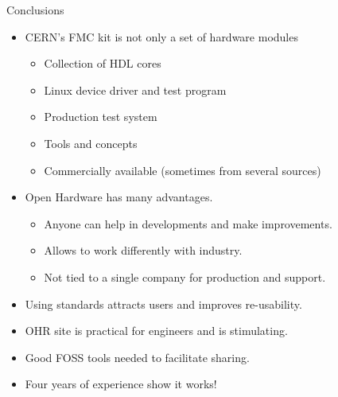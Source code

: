 \documentclass[compress,red]{beamer}
\begin{document}
\begin{frame}{Conclusions}

  \begin{block}{}
    \begin{itemize}
    \item CERN's FMC kit is not only a set of hardware modules
      \begin{itemize}
      \item Collection of HDL cores
      \item Linux device driver and test program
      \item Production test system
      \item Tools and concepts %
      \item Commercially available (sometimes from several sources)
      \end{itemize}
    \item Open Hardware has many advantages.
      \begin{itemize}
      \item Anyone can help in developments and make improvements.
      \item Allows to work differently with industry. %
      \item Not tied to a single company for production and support.
      \end{itemize}
    \item Using standards attracts users and improves re-usability. %
    \item OHR site is practical for engineers and is stimulating.
    \item Good FOSS tools needed to facilitate sharing.
    \item Four years of experience show it works!
    \end{itemize}
  \end{block}

  \note[item]{}

\end{frame}





\end{document}
